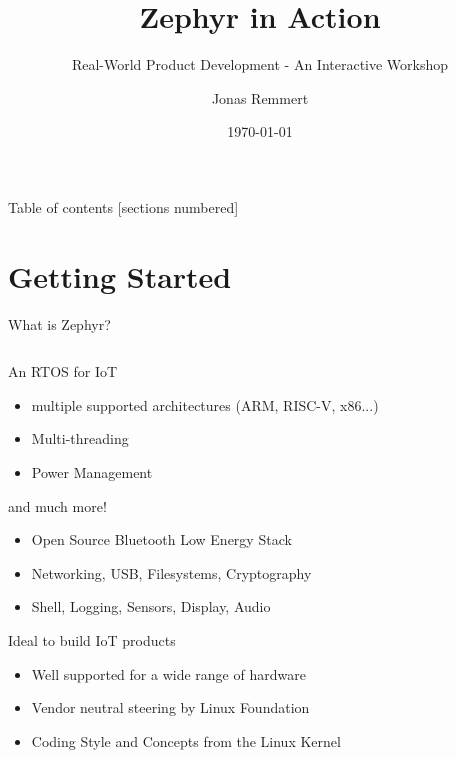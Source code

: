\documentclass[10pt, aspectratio=169]{beamer}
\title{Zephyr in Action}
\subtitle{Real-World Product Development - An Interactive Workshop}
\date{\today}
\author{Jonas Remmert}
\begin{document}
\maketitle

\begin{frame}{Table of contents}
  [sections numbered]
  \tableofcontents[hideallsubsections]
\end{frame}

\section{Getting Started}

\begin{frame}[fragile]{What is Zephyr?}

  \begin{columns}

    \begin{column}{0.6\textwidth}
      \begin{block}{An RTOS for IoT}
        \begin{itemize}
          \item multiple supported architectures (ARM, RISC-V, x86...)
          \item Multi-threading
          \item Power Management
        \end{itemize}
      \end{block}
      \begin{block}{and much more!}
        \begin{itemize}
          \item Open Source Bluetooth Low Energy Stack
          \item Networking, USB, Filesystems, Cryptography
          \item Shell, Logging, Sensors, Display, Audio
        \end{itemize}
      \end{block}
      \begin{block}{Ideal to build IoT products}
        \begin{itemize}
          \item Well supported for a wide range of hardware
          \item Vendor neutral steering by Linux Foundation
          \item Coding Style and Concepts from the Linux Kernel
        \end{itemize}
      \end{block}
    \end{column}


\end{columns}
\end{frame}
\end{document}

